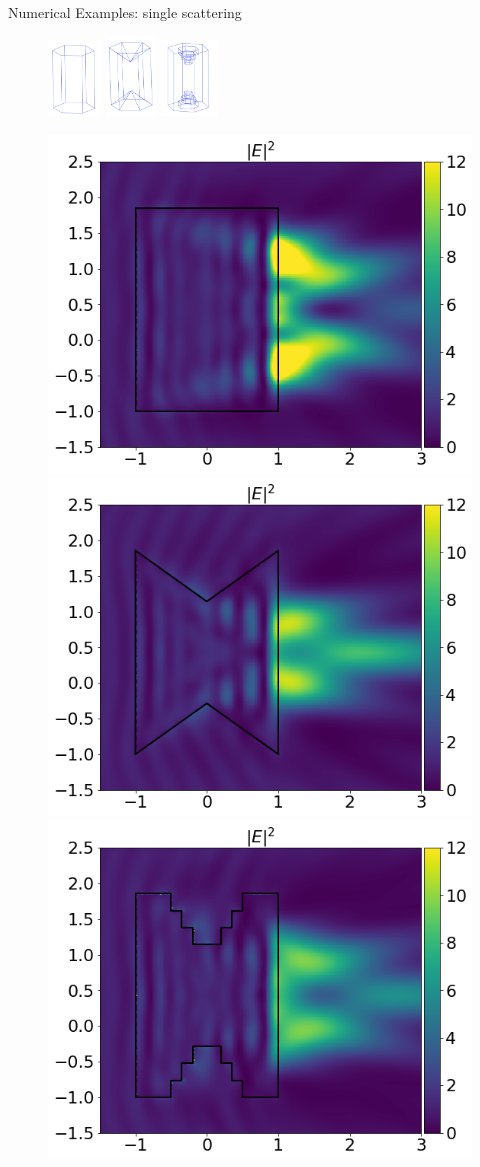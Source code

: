 \documentclass[12pt]{beamer}
\begin{document}
\begin{frame}{Numerical Examples: single scattering}
    \begin{figure}
\centering
        \centering
        \includegraphics[height = 2cm]{Figures/hex.png} \hspace{2cm}%
        \includegraphics[height = 2.1cm]{Figures/cavity.png} \hspace{2cm}%
        \includegraphics[height = 2cm]{Figures/cavity_stepped.png}
\end{figure}

\begin{figure}
        \centering
        \includegraphics[width = 0.31 \textwidth]{Figures/hex_result.png} 
        \includegraphics[width = 0.31 \textwidth]{Figures/cavity_result.png} 
        \includegraphics[width = 0.31 \textwidth]{Figures/stepped_cavity_result.png}
\end{figure}


\end{frame}
\end{document}
